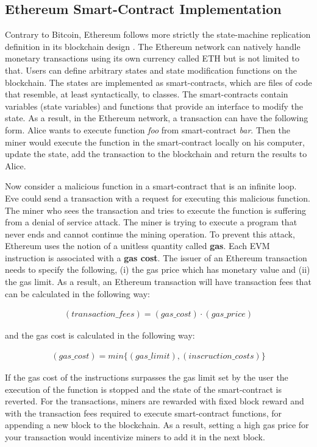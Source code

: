 {{\subsection{Ethereum Smart-Contract Implementation}{

Contrary to Bitcoin, Ethereum follows more strictly the state-machine replication definition in its blockchain design \cite{WoodGavin2014Ethereum:Ledger}. The Ethereum network can natively handle monetary transactions using its own currency called ETH but is not limited to that. Users can define arbitrary states and state modification functions on the blockchain. The states are implemented as smart-contracts, which are files of code that resemble, at least syntactically, to classes. The smart-contracts contain variables (state variables) and functions that provide an interface to modify the state. As a result, in the Ethereum network, a transaction can have the following form. Alice wants to execute function \textit{foo} from smart-contract \textit{bar}. Then the miner would execute the function in the smart-contract locally on his computer, update the state, add the transaction to the blockchain and return the results to Alice.

Now consider a malicious function in a smart-contract that is an infinite loop. Eve could send a transaction with a request for executing this malicious function. The miner who sees the transaction and tries to execute the function is suffering from a denial of service attack. The miner is trying to execute a program that never ends and cannot continue the mining operation. To prevent this attack, Ethereum uses the notion of a unitless quantity called \textbf{gas}. Each EVM instruction is associated with a \textbf{gas cost}. The issuer of an Ethereum transaction needs to specify the following, (i) the gas price which has monetary value and (ii) the gas limit. As a result, an Ethereum transaction will have transaction fees that can be calculated in the following way:

\begin{align*}
 (transaction\_fees) = (gas\_cost) \cdot (gas\_price)
\end{align*}

and the gas cost is calculated in the following way:

\begin{align*}
 (gas\_cost) = min\{(gas\_limit),(inscruction\_costs)\}
\end{align*}

If the gas cost of the instructions surpasses the gas limit set by the user the execution of the function is stopped and the state of the smart-contract is reverted. For the transactions, miners are rewarded with fixed block reward and with the transaction fees required to execute smart-contract functions, for appending a new block to the blockchain. As a result, setting a high gas price for your transaction would incentivize miners to add it in the next block.

}}}
